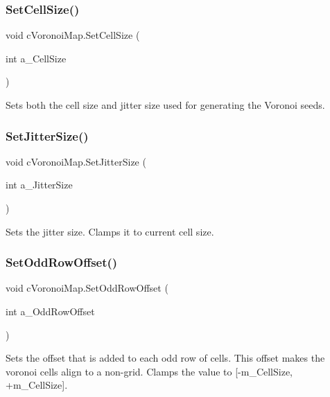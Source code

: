 \subsubsection{\texorpdfstring{Set\+Cell\+Size()}{SetCellSize()}}
{\footnotesize\ttfamily void c\+Voronoi\+Map.\+Set\+Cell\+Size (\begin{DoxyParamCaption}\item[{int}]{a\+\_\+\+Cell\+Size }\end{DoxyParamCaption})\hspace{0.3cm}{\ttfamily [inline]}}

Sets both the cell size and jitter size used for generating the Voronoi seeds. \mbox{\label{classc_voronoi_map_ab9f95a3c7799d9010885145f19ce77b1}} 
\subsubsection{\texorpdfstring{Set\+Jitter\+Size()}{SetJitterSize()}}
{\footnotesize\ttfamily void c\+Voronoi\+Map.\+Set\+Jitter\+Size (\begin{DoxyParamCaption}\item[{int}]{a\+\_\+\+Jitter\+Size }\end{DoxyParamCaption})\hspace{0.3cm}{\ttfamily [inline]}}

Sets the jitter size. Clamps it to current cell size. \mbox{\label{classc_voronoi_map_a7c2196f0a071bb4f1ed9dbc82f42faed}} 
\subsubsection{\texorpdfstring{Set\+Odd\+Row\+Offset()}{SetOddRowOffset()}}
{\footnotesize\ttfamily void c\+Voronoi\+Map.\+Set\+Odd\+Row\+Offset (\begin{DoxyParamCaption}\item[{int}]{a\+\_\+\+Odd\+Row\+Offset }\end{DoxyParamCaption})\hspace{0.3cm}{\ttfamily [inline]}}

Sets the offset that is added to each odd row of cells. This offset makes the voronoi cells align to a non-\/grid. Clamps the value to \mbox{[}-\/m\+\_\+\+Cell\+Size, +m\+\_\+\+Cell\+Size\mbox{]}. \mbox{\label{classc_voronoi_map_a39a8d8c3c8c0c4adc3d953dfc5e29b87}} 
